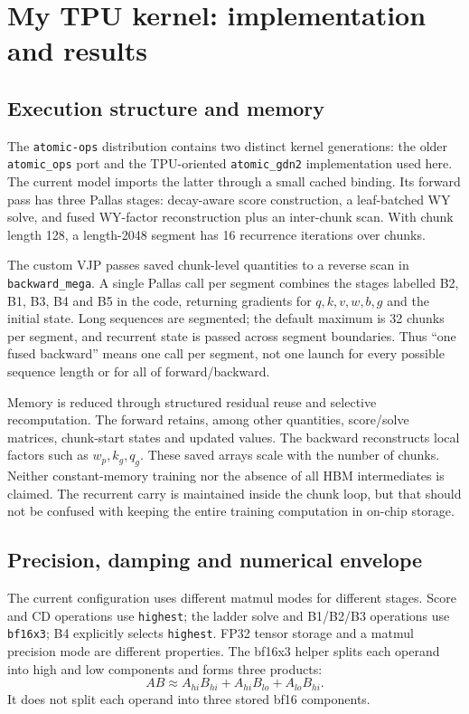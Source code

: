 \documentclass[10pt,a4paper]{article}
\begin{document}
\section{My TPU kernel: implementation and results}
\subsection{Execution structure and memory}
The \texttt{atomic-ops} distribution contains two distinct kernel generations:
the older \texttt{atomic\_ops} port and the TPU-oriented \texttt{atomic\_gdn2} implementation
used here. The current model imports the latter through a small cached binding.
Its forward pass has three Pallas stages: decay-aware score construction, a leaf-batched
WY solve, and fused WY-factor reconstruction plus an inter-chunk scan. With chunk length
128, a length-2048 segment has 16 recurrence iterations over chunks.

The custom VJP passes saved chunk-level quantities to a reverse scan in
\texttt{backward\_mega}. A single Pallas call per segment combines the stages labelled
B2, B1, B3, B4 and B5 in the code, returning gradients for $q,k,v,w,b,g$ and the initial state.
Long sequences are segmented; the default maximum is 32 chunks per segment, and recurrent
state is passed across segment boundaries. Thus ``one fused backward'' means one call
per segment, not one launch for every possible sequence length or for all of forward/backward.

Memory is reduced through structured residual reuse and selective recomputation.
The forward retains, among other quantities, score/solve matrices, chunk-start states and
updated values. The backward reconstructs local factors such as $w_p,k_g,q_g$.
These saved arrays scale with the number of chunks. Neither constant-memory training
nor the absence of all HBM intermediates is claimed. The recurrent carry is maintained
inside the chunk loop, but that should not be confused with keeping the entire training
computation in on-chip storage.

\subsection{Precision, damping and numerical envelope}
The current configuration uses different matmul modes for different stages. Score and
CD operations use \texttt{highest}; the ladder solve and B1/B2/B3 operations use
\texttt{bf16x3}; B4 explicitly selects \texttt{highest}. FP32 tensor storage and a matmul
precision mode are different properties. The bf16x3 helper splits each operand into high
and low components and forms three products:
\begin{equation}
 AB\approx A_{hi}B_{hi}+A_{hi}B_{lo}+A_{lo}B_{hi}.
\end{equation}
It does not split each operand into three stored bf16 components.
\end{document}
